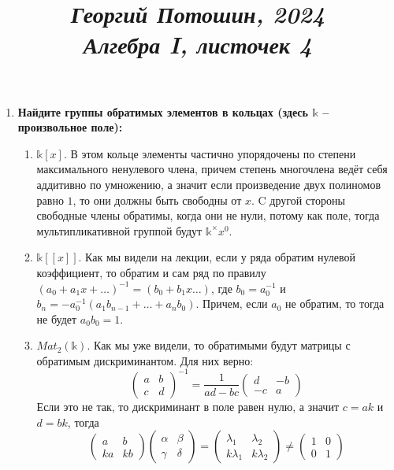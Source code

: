 \documentclass{article}
\title{
\textit{\small{Георгий Потошин, 2024}}\\
\vspace{0.3ex}
\textit{\huge{Алгебра I, листочек 4}}\vspace{1ex}
}
\date{\vspace{-10ex}}
\begin{document}
\maketitle

\begin{enumerate}
    \item \textbf{Найдите группы обратимых элементов в кольцах (здесь $\mathbb{k}$
        – произвольное поле):}
    \begin{enumerate}
        \item $\mathbb{k}[x]$. В этом кольце элементы частично упорядочены по
            степени максимального ненулевого члена, причем степень многочлена
            ведёт себя аддитивно по умножению, а значит если произведение двух
            полиномов равно $1$, то они должны быть свободны от $x$. C другой
            стороны свободные члены обратимы, когда они не нули, потому как
            поле, тогда мультипликативной группой будут $\mathbb{k}^\times x^{0}$.
        \item $\mathbb{k}[[x]]$. Как мы видели на лекции, если у ряда обратим
            нулевой коэффициент, то обратим и сам ряд по правилу $(a_0+a_1x+
            \ldots)^{-1}=(b_0+b_1x\ldots)$, где $b_0=a_0^{-1}$ и $b_n=-a_0^{-1}
            (a_1b_{n-1}+\ldots+a_nb_0)$. Причем, если $a_0$ не обратим, то тогда
            не будет $a_0b_0=1$.
        \item $\mathit{Mat}_2(\mathbb{k})$. Как мы уже видели, то обратимыми
            будут матрицы с обратимым дискриминантом. Для них верно:
            \[
                \left(\begin{array}{cc}a&b\\c&d\end{array}\right)^{-1}=\frac{1}
                    {ad-bc}\left(\begin{array}{cc}d&-b\\-c&a\end{array}\right)
            \]
            Если это не так, то дискриминант в поле равен нулю, а значит $c=ak$
            и $d=bk$, тогда
            \[
                \left(\begin{array}{cc}a&b\\ka&kb\end{array}\right)
                \left(\begin{array}{cc}\alpha&\beta\\\gamma&\delta\end{array}\right)=
                \left(\begin{array}{cc}\lambda_1&\lambda_2\\k\lambda_1&k\lambda_2\end{array}\right)
                \neq\left(\begin{array}{cc}1&0\\0&1\end{array}\right)
            \]
    \end{enumerate}


\end{enumerate}
\end{document}
